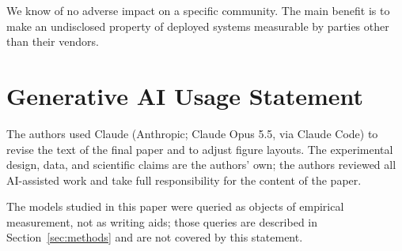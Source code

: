 \documentclass[manuscript,screen,review,anonymous]{acmart}
\begin{document}
We know of no adverse impact on a specific community. The main benefit is to
make an undisclosed property of deployed systems measurable by parties other than
their vendors.

\section*{Generative AI Usage Statement}


The authors used Claude (Anthropic; Claude Opus 5.5, via Claude Code) to revise 
the text of the final paper and to adjust figure layouts.
The experimental design, data, and scientific claims are the authors' own;
the authors reviewed all AI-assisted work and take full responsibility
for the content of the paper.

The models studied in this paper were queried as objects of empirical
measurement, not as writing aids; those queries are described in
Section~\ref{sec:methods} and are not covered by this statement.
\end{document}
